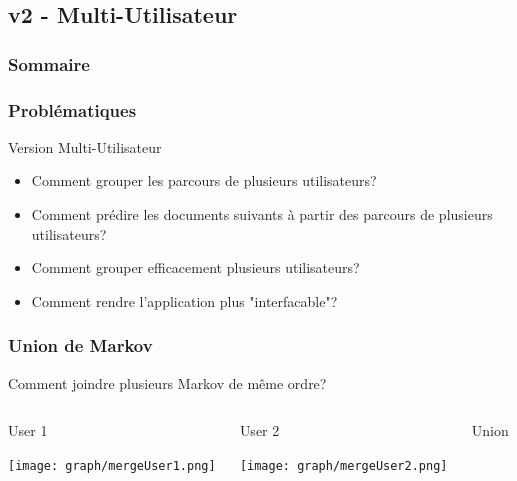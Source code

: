 \documentclass{beamer}
\begin{document}
        \subsection{v2 - Multi-Utilisateur}
            \begin{frame}
                \frametitle{Sommaire}
            \end{frame}
            \begin{frame}
            \frametitle{Problématiques}
            Version Multi-Utilisateur
            \pause
            \begin{itemize}
            \item Comment grouper les parcours de plusieurs utilisateurs?
            \pause
            \item Comment prédire les documents suivants à partir des parcours de plusieurs utilisateurs?
            \pause
            \item Comment grouper efficacement plusieurs utilisateurs?
            \pause
            \item Comment rendre l'application plus "interfacable"?
            \end{itemize}
            \end{frame}
            \begin{frame}
            \frametitle{Union de Markov}
            Comment joindre plusieurs Markov de même ordre?
            \pause[2]
            \begin{columns}[t]
            \begin{column}{3cm}
            \begin{exampleblock}{User 1}
            \begin{center}
            \texttt{[image: graph/mergeUser1.png]}
            \end{center}
            \end{exampleblock}
            \end{column}
            \begin{column}{3cm}
            \begin{exampleblock}{User 2}
            \begin{center}
            \texttt{[image: graph/mergeUser2.png]}
            \end{center}
            \end{exampleblock}
            \end{column}
            \pause[3]
            \begin{column}{3cm}
            \begin{exampleblock}{Union}
            \begin{center}
            \pause[4]
            \end{center}
            \end{exampleblock}
            \end{column}
            \end{columns}
            \end{frame}
\end{document}
